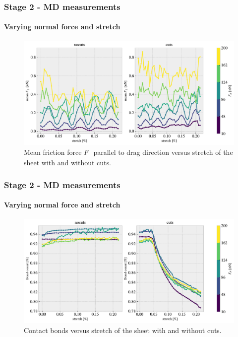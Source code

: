 \documentclass[
	10pt, %
]{beamer}
\begin{document}
\begin{frame}
	\frametitle{Stage 2 - MD measurements}
	\framesubtitle{Varying normal force and stretch}
	\begin{figure}
		\includegraphics[width=\linewidth]{figures/multi2.pdf}
		\caption{Mean friction force $F_{\parallel}$ parallel to drag direction versus stretch of the sheet with and without cuts.}
	\end{figure}	
\end{frame}

\begin{frame}
	\frametitle{Stage 2 - MD measurements}
	\framesubtitle{Varying normal force and stretch}
	\begin{figure}
		\includegraphics[width=\linewidth]{figures/multi3.pdf}
		\caption{Contact bonds versus stretch of the sheet with and without cuts.}
	\end{figure}	
\end{frame}
\end{document}
